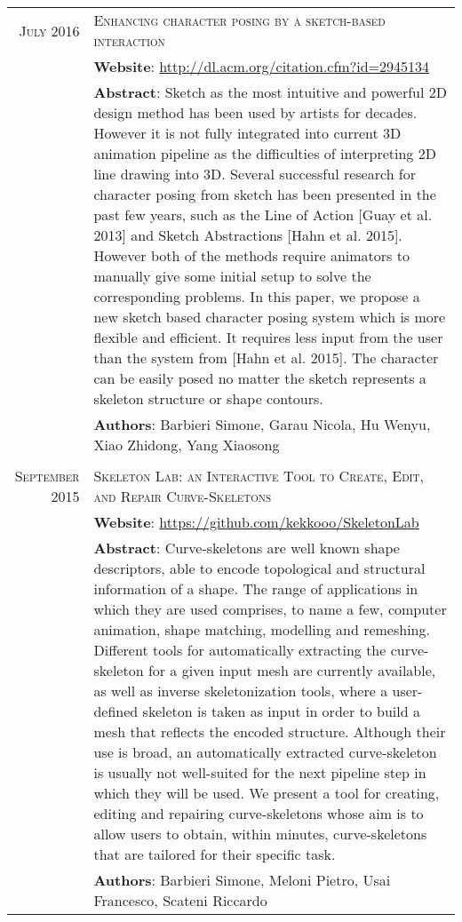 \documentclass[a4paper,10pt]{article} %
\begin{document}
\begin{tabular}{rp{11cm}}
\textsc{July} 2016 & \textsc{Enhancing character posing by a sketch-based interaction}\\
& \textbf{Website}: \href{http://dl.acm.org/citation.cfm?id=2945134}{http://dl.acm.org/citation.cfm?id=2945134}\\
& \textbf{Abstract}: Sketch as the most intuitive and powerful 2D design method has been used by artists for decades. However it is not fully integrated into current 3D animation pipeline as the difficulties of interpreting 2D line drawing into 3D. Several successful research for character posing from sketch has been presented in the past few years, such as the Line of Action [Guay et al. 2013] and Sketch Abstractions [Hahn et al. 2015]. However both of the methods require animators to manually give some initial setup to solve the corresponding problems. In this paper, we propose a new sketch based character posing system which is more flexible and efficient. It requires less input from the user than the system from [Hahn et al. 2015]. The character can be easily posed no matter the sketch represents a skeleton structure or shape contours.\\
& \small \textbf{Authors}: Barbieri Simone, Garau Nicola, Hu Wenyu, Xiao Zhidong, Yang Xiaosong\\
& \\

\textsc{September} 2015 & \textsc{Skeleton Lab: an Interactive Tool to Create, Edit, and Repair Curve-Skeletons}\\
& \textbf{Website}: \href{https://github.com/kekkooo/SkeletonLab}{https://github.com/kekkooo/SkeletonLab}\\
& \textbf{Abstract}: Curve-skeletons are well known shape descriptors, able to encode topological and structural information of a shape. The range of applications in which they are used comprises, to name a few, computer animation, shape matching, modelling and remeshing. Different tools for automatically extracting the curve-skeleton for a given input mesh are currently available, as well as inverse skeletonization tools, where a user-defined skeleton is taken as input in order to build a mesh that reflects the encoded structure. Although their use is broad, an automatically extracted curve-skeleton is usually not well-suited for the next pipeline step in which they will be used. We present a tool for creating, editing and repairing curve-skeletons whose aim is to allow users to obtain, within minutes, curve-skeletons that are tailored for their specific task.\\
& \small \textbf{Authors}: Barbieri Simone, Meloni Pietro, Usai Francesco, Scateni Riccardo

\end{tabular}
\end{document}

